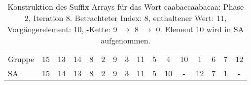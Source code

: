\begin{table}[H]
\begin{adjustbox}{max width=\textwidth}
\begin{tabular}{lccccccccccccccc}
\multicolumn{1}{l|}{Gruppe}  & \multicolumn{1}{c|}{15} & 13 & \multicolumn{1}{c|}{14} & \multicolumn{1}{c|}{8}     & \multicolumn{1}{c|}{2}      & \multicolumn{1}{c|}{9}    & \multicolumn{1}{c|}{3}     & \multicolumn{1}{c|}{11}                         & \multicolumn{1}{c|}{5}   & 4                          & \multicolumn{1}{c|}{10} & 1   & 6   & 7   & 12  \\
\multicolumn{1}{l|}{SA}      & \multicolumn{1}{c|}{15} & 14 & \multicolumn{1}{c|}{13} & \multicolumn{1}{c|}{8}     & \multicolumn{1}{c|}{2}      & \multicolumn{1}{c|}{9}    & \multicolumn{1}{c|}{3}     & \multicolumn{1}{c|}{\cellcolor[HTML]{\green}11} & \multicolumn{1}{c|}{5}   & \cellcolor[HTML]{\red}10 & \multicolumn{1}{c|}{-}  & 12  & 7   & 1   & -  
\end{tabular}
\end{adjustbox}

\caption[Konstruktion des Suffix Arrays f{\"u}r das Wort caabaccaabacaa: Phase 2, Iteration 8]{Konstruktion des Suffix Arrays f{\"u}r das Wort caabaccaabacaa: Phase 2, Iteration 8. Betrachteter Index: 8, enthaltener Wert: 11, Vorg{\"a}ngerelement: 10, \prevpointer-Kette: 9 $\rightarrow$ 8 $\rightarrow$ 0. Element 10 wird in SA aufgenommen.}
\label{table_complex_example_2_8} 
\end{table}

